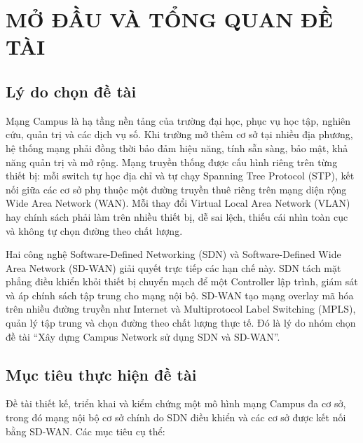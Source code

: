\section{MỞ ĐẦU VÀ TỔNG QUAN ĐỀ TÀI}\label{sec:mo_dau_tong_quan}

\subsection{Lý do chọn đề tài}

Mạng Campus là hạ tầng nền tảng của trường đại học, phục vụ học tập, nghiên cứu, quản trị và các dịch vụ số. Khi trường mở thêm cơ sở tại nhiều địa phương, hệ thống mạng phải đồng thời bảo đảm hiệu năng, tính sẵn sàng, bảo mật, khả năng quản trị và mở rộng. Mạng truyền thống được cấu hình riêng trên từng thiết bị: mỗi switch tự học địa chỉ và tự chạy Spanning Tree Protocol (STP), kết nối giữa các cơ sở phụ thuộc một đường truyền thuê riêng trên mạng diện rộng Wide Area Network (WAN). Mỗi thay đổi Virtual Local Area Network (VLAN) hay chính sách phải làm trên nhiều thiết bị, dễ sai lệch, thiếu cái nhìn toàn cục và không tự chọn đường theo chất lượng.

Hai công nghệ Software-Defined Networking (SDN) và Software-Defined Wide Area Network (SD-WAN) giải quyết trực tiếp các hạn chế này. SDN tách mặt phẳng điều khiển khỏi thiết bị chuyển mạch để một Controller lập trình, giám sát và áp chính sách tập trung cho mạng nội bộ. SD-WAN tạo mạng overlay mã hóa trên nhiều đường truyền như Internet và Multiprotocol Label Switching (MPLS), quản lý tập trung và chọn đường theo chất lượng thực tế. Đó là lý do nhóm chọn đề tài ``Xây dựng Campus Network sử dụng SDN và SD-WAN''.

\subsection{Mục tiêu thực hiện đề tài}

Đề tài thiết kế, triển khai và kiểm chứng một mô hình mạng Campus đa cơ sở, trong đó mạng nội bộ cơ sở chính do SDN điều khiển và các cơ sở được kết nối bằng SD-WAN. Các mục tiêu cụ thể:

